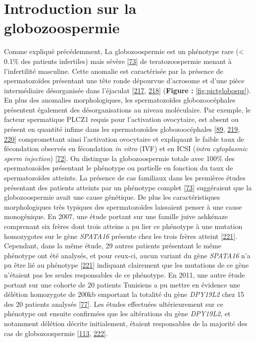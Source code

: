 \documentclass[12pt,a4paper,twoside]{ugathesis}
\theoremstyle{definition}
\theoremstyle{definition}
\theoremstyle{definition}
\theoremstyle{remark}
\begin{document}
\newpage 

\section{Introduction sur la
globozoospermie}\label{introduction-sur-la-globozoospermie}

Comme expliqué précédemment, La globozoospermie est un phénotype rare
(\textless{} 0.1\% des patients infertiles) mais sévère
{[}\protect\hyperlink{ref-Sen2009}{73}{]} de teratozoospermie menant à
l'infertilité masculine. Cette anomalie est caractérisée par la présence
de spermatozoïdes présentant une tête ronde dépourvue d'acrosome et
d'une pièce intermédiaire désorganisée dans l'éjaculat
{[}\protect\hyperlink{ref-Singh}{217},
\protect\hyperlink{ref-Pedersen1974}{218}{]} (\textbf{Figure :
}\ref{fig:pictglobospz}). En plus des anomalies morphologiques, les
spermatozoïdes globozoocéphales présentent également des
désorganisations au niveau moléculaire. Par exemple, le facteur
spermatique PLCZ1 requis pour l'activation ovocytaire, est absent ou
présent en quantité infime dans les spermatozoïdes globozoocéphales
{[}\protect\hyperlink{ref-Heytens2009}{89},
\protect\hyperlink{ref-Taylor2010}{219},
\protect\hyperlink{ref-Yoon2008}{220}{]} compromettant ainsi
l'activation ovocytaire et expliquant le faible taux de fécondation
observés en fécondation \emph{in vitro} (IVF) et en ICSI (\emph{intra
cytoplasmic sperm injection}) {[}\protect\hyperlink{ref-Dam2006}{72}{]}.
On distingue la globozoospermie totale avec 100\% des spermatozoïdes
présentant le phénotype ou partielle en fonction du taux de
spermatozoïdes atteints. La présence de cas familiaux dans les premières
études présentant des patients atteints par un phénotype complet
{[}\protect\hyperlink{ref-Sen2009}{73}{]} suggéraient que la
globozoospermie avait une cause génétique. De plus les caractéristiques
morphologiques très typiques des spermatozoïdes laissaient penser à une
cause monogénique. En 2007, une étude portant sur une famille juive
ashkénaze comprenant six frères dont trois atteins a pu lier ce
phénotype à une mutation homozygotes sur le gène \emph{SPATA16} présente
chez les trois frères atteint
{[}\protect\hyperlink{ref-Dam2007}{221}{]}. Cependant, dans la même
étude, 29 autres patients présentant le même phénotype ont été analysés,
et pour ceux-ci, aucun variant du gène \emph{SPATA16} n'a pu être lié au
phénotype {[}\protect\hyperlink{ref-Dam2007}{221}{]} indiquant
clairement que les mutations de ce gène n'étaient pas les seules
responsables de ce phénotype. En 2011, une autre étude portant sur une
cohorte de 20 patients Tunisiens a pu mettre en évidence une délétion
homozygote de 200kb emportant la totalité du gène \emph{DPY19L2} chez 15
des 20 patients analysés {[}\protect\hyperlink{ref-Harbuz2011}{77}{]}.
Les études effectuées ultérieurement sur ce phénotype ont ensuite
confirmées que les altérations du gène \emph{DPY19L2}, et notamment
délétion décrite initialement, étaient responsables de la majorité des
cas de globozoospermie {[}\protect\hyperlink{ref-ElInati2012}{113},
\protect\hyperlink{ref-Ray2011}{222}{]}.
\end{document}
